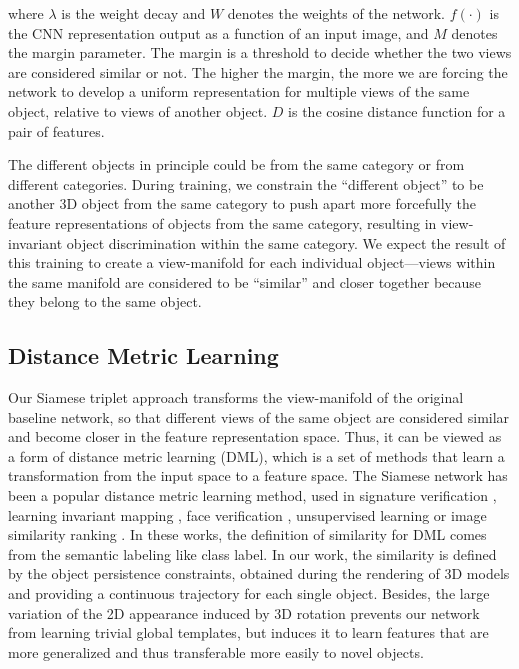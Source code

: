 \documentclass{article} %
\begin{document}
where $\lambda$ is the weight decay and $W$ denotes the weights of the network. $f(\cdot)$ is the CNN representation output as a function of an input image, and $M$ denotes the margin parameter. The margin is a threshold to decide whether the two views are considered similar or not. The higher the margin, the more we are forcing the network to develop a uniform representation for multiple views of the same object, relative to views of another object. $D$ is the cosine distance function for a pair of features.

The different objects in principle could be from the same category or from different categories. During training, we constrain the ``different object'' to be another 3D object from the same category to push apart more forcefully the feature representations of objects from the same category, resulting in view-invariant object discrimination within the same category. We expect the result of this training to create a view-manifold for each individual object---views within the same manifold are considered to be ``similar'' and closer together because they belong to the same object.

\subsection{Distance Metric Learning}
Our Siamese triplet approach transforms the view-manifold of the original baseline network, so that different views of the same object are considered similar and become closer in the feature representation space. Thus, it can be viewed as a form of distance metric learning (DML), which is a set of methods that learn a transformation from the input space to a feature space. The Siamese network has been a popular distance metric learning method, used in signature verification \citep{bromley1993signature}, learning invariant mapping \citep{hadsell2006dimensionality}, face verification \citep{chopra2005learning}, unsupervised learning \citep{DBLP:journals/corr/WangG15a} or image similarity ranking \citep{wang2014learning}. In these works, the definition of similarity for DML comes from the semantic labeling like class label. In our work, the similarity is defined by the object persistence constraints, obtained during the rendering of 3D models and providing a continuous trajectory for each single object. Besides, the large variation of the 2D appearance induced by 3D rotation prevents our network from learning trivial global templates, but induces it to learn features that are more generalized and thus transferable more easily to novel objects.
\end{document}
